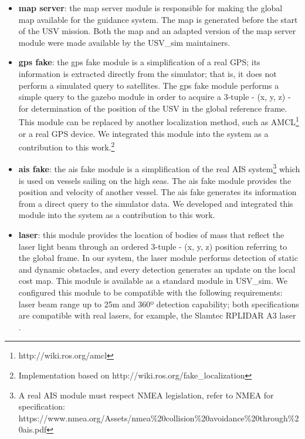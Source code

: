     \begin{itemize}
    
        \item \textbf{map server}: the map server module is responsible for making the global map available for the guidance system. The map is generated before the start of the \ac{USV} mission. Both the map and an adapted version of the map server module were made available by the USV\_sim maintainers.
    
        \item \textbf{gps fake}: the gps fake module is a simplification of a real GPS; its information is extracted directly from the simulator; that is, it does not perform a simulated query to satellites. The gps fake module performs a simple query to the gazebo module in order to acquire a 3-tuple - (x, y, z) - for determination of the position of the \ac{USV} in the global reference frame. This module can be replaced by another localization method, such as \ac{AMCL}\footnote{http://wiki.ros.org/amcl} or a real GPS device. We integrated this module into the system as a contribution to this work.\footnote{Implementation based on http://wiki.ros.org/fake\_localization}
    
        \item \textbf{ais fake}: the ais fake module is a simplification of the real AIS system\footnote{A real AIS module must respect NMEA legislation, refer to NMEA for specification: https://www.nmea.org/Assets/nmea\%20collision\%20avoidance\%20through\%20ais.pdf} which is used on vessels sailing on the high seas. The ais fake module provides the position and velocity of another vessel. The ais fake generates its information from a direct query to the simulator data. We developed and integrated this module into the system as a contribution to this work.
    
        \item \textbf{laser}: this module provides the location of bodies of mass that reflect the laser light beam through an ordered 3-tuple - (x, y, z) position referring to the global frame. In our system, the laser module performs detection of static and dynamic obstacles, and every detection generates an update on the local cost map. This module is available as a standard module in USV\_sim. We configured this module to be compatible with the following requirements: laser beam range up to 25m and 360º detection capability; both specifications are compatible with real lasers, for example, the Slamtec RPLIDAR A3 laser \cite{RPLidarA3}.
    
    \end{itemize}
    
